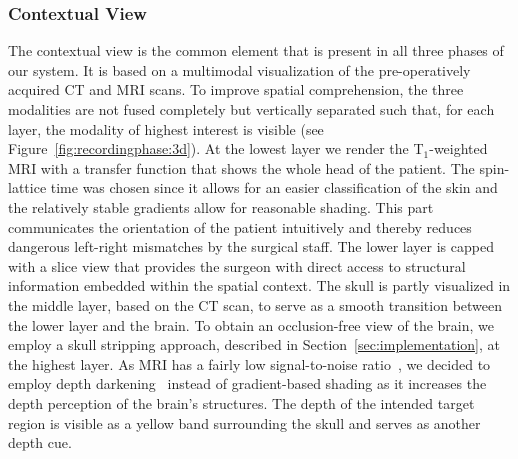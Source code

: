 \documentclass[review]{vgtc}                 %
\begin{document}

\subsubsection{Contextual View}\label{sec:overview:planning:3d}
The contextual view is the common element that is present in all three phases of our system. %
It is based on a multimodal visualization of the pre-operatively acquired CT and MRI scans. To improve spatial comprehension, the three modalities are not fused completely but vertically separated such that, for each layer, the modality of highest interest is visible (see Figure~\ref{fig:recordingphase:3d}). At the lowest layer we render the T$_1$-weighted MRI with a transfer function that shows the whole head of the patient. The spin-lattice time was chosen since it allows for an easier classification of the skin and the relatively stable gradients allow for reasonable shading. This part communicates the orientation of the patient intuitively and thereby reduces dangerous left-right mismatches by the surgical staff.
The lower layer is capped with a slice view that provides the surgeon with direct access to structural information embedded within the spatial context. The skull is partly visualized in the middle layer, based on the CT scan, to serve as a smooth transition between the lower layer and the brain. To obtain an occlusion-free view of the brain, we employ a skull stripping approach, described in Section~\ref{sec:implementation}, at the highest layer. As MRI has a fairly low signal-to-noise ratio~\cite{Herrmann11}, we decided to employ depth darkening~\cite{Luft2005} instead of gradient-based shading as it increases the depth perception of the brain's structures. The depth of the intended target region is visible as a yellow band surrounding the skull and serves as another depth cue.
\end{document}
